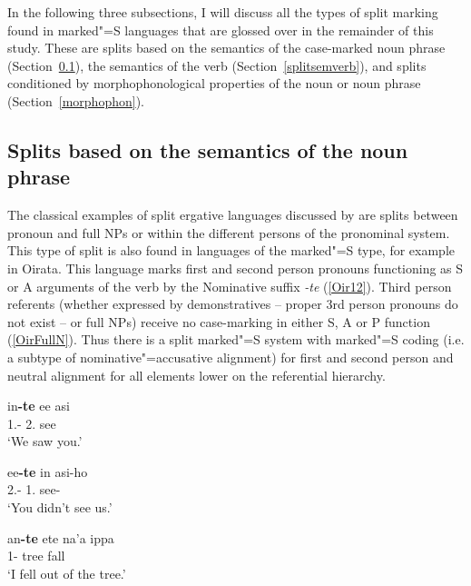 In the following three subsections, I will discuss all the types of split marking found in marked"=S languages that are glossed over in the remainder of this study. 
These are splits based on the semantics of the case-marked noun phrase (Section~\ref{splitsemnoun}), the semantics of the verb (Section~\ref{splitsemverb}), and splits conditioned by morphophonological properties of the noun or noun phrase (Section~\ref{morphophon}).

\subsection{Splits based on the semantics of the noun phrase}\label{splitsemnoun}

The classical examples of split ergative languages discussed by \citet{Silverstein:1976} are splits between pronoun and full NPs or within the different persons of the pronominal system. 
This type of split is also found in languages of the marked"=S type, for example in Oirata.
This language marks first and second person pronouns functioning as S or A arguments of the verb by the Nominative suffix \emph{-te} (\ref{Oir12}).
Third person referents (whether expressed by demonstratives -- proper 3rd person pronouns do not exist -- or full NPs) receive no case-marking in either S, A or P function (\ref{OirFullN}). 
Thus there is a split marked"=S system with marked"=S coding (i.e. a subtype of nominative"=accusative alignment) for first and second person and neutral alignment for all elements lower on the referential hierarchy.


\begin{exe}\ex\label{Oir12}\nopagebreak[4]
\begin{xlist}\ex\gll in\textbf{-te} ee asi\\
1\pl{}.\excl{}-\nom{} 2\sg{}.\polite{} see\\
\glt `We saw you.'

\ex\gll ee\textbf{-te} in asi-ho\\
2\sg.\polite{}-\nom{} 1\pl.\excl{} see-\Neg{}\\
\glt `You didn't see us.'

\ex\gll an\textbf{-te} ete na'a ippa\\
1\sg{}-\nom{} tree \obl{} fall\\
\glt `I fell out of the tree.'

\end{xlist}\end{exe}

